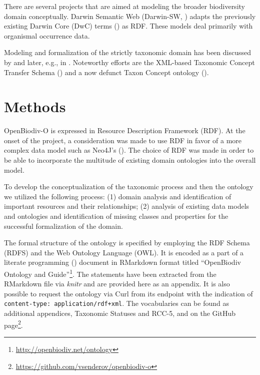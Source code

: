 There are several projects that are aimed at modeling the broader biodiversity domain conceptually. Darwin Semantic Web (Darwin-SW, \cite{baskauf_darwin-sw:_2016}) adapts the previously existing Darwin Core (DwC) terms (\cite{wieczorek_darwin_2012}) as RDF. These models deal primarily with organismal occurrence data.

Modeling and formalization of the strictly taxonomic domain has been discussed by \cite{berendsohn_concept_1995} and later, e.g., in \cite{franz_perspectives:_2009,sterner_taxonomy_2017}. Noteworthy efforts are the XML-based Taxonomic Concept Transfer Schema (\cite{taxonomic_names_and_concepts_interest_group_taxonomic_2006}) and a now defunct Taxon Concept ontology (\cite{devries_taxon_nodate}).

\section{Methods}

\mbox{OpenBiodiv-O} is expressed in Resource Description Framework (RDF). At the onset of the project, a consideration was made to use RDF in favor of a more complex data model such as Neo4J's (\cite{senderov_open_2016}). The choice of RDF was made in order to be able to incorporate the multitude of existing domain ontologies into the overall model.

To develop the conceptualization of the taxonomic process and then the ontology we utilized the following process: (1) domain analysis and identification of important resources and their relationships; (2) analysis of existing data models and ontologies and identification of missing classes and properties for the successful formalization of the domain.

The formal structure of the ontology is specified by employing the RDF Schema (RDFS) and the Web Ontology Language (OWL). It is encoded as a part of a literate programming (\cite{knuth_literate_1984}) document in RMarkdown format titled ``OpenBiodiv Ontology and Guide''\footnote{\href{http://openbiodiv.net/ontology}{http://openbiodiv.net/ontology}}. The statements have been extracted from the RMarkdown file via \emph{knitr} and are provided here as an appendix. It is also possible to request the ontology via Curl from its endpoint with the indication of {\tt content-type: application/rdf+xml}. The vocabularies can be found as additional appendices, Taxonomic Statuses and RCC-5, and on the GitHub page\footnote{\href{https://github.com/vsenderov/openbiodiv-o}{https://github.com/vsenderov/openbiodiv-o}}.

